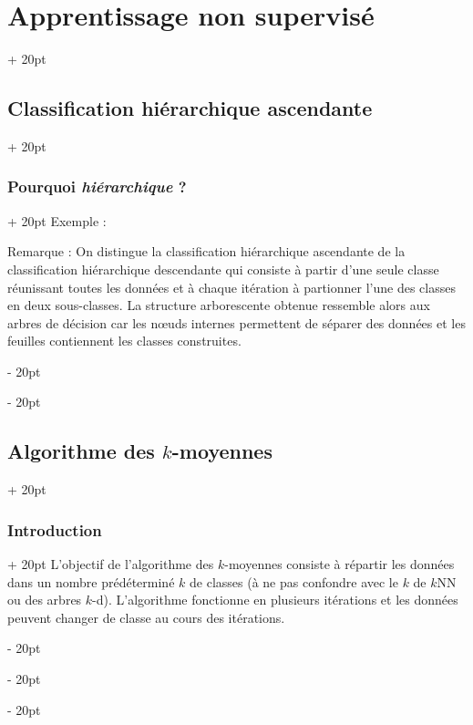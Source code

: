 \documentclass[a4paper, 12pt, twoside]{article}
\newcommand{\ind}[1][20pt]{\advance\leftskip + #1}
\newcommand{\deind}[1][20pt]{\advance\leftskip - #1}
\newenvironment{indt}[2][20pt]{#2 \par \ind[#1]}{\par \deind} %
\begin{document}
\begin{indt}{\section{Apprentissage non supervisé}}
\begin{indt}{\subsection{Classification hiérarchique ascendante}}
\begin{indt}{\subsubsection{Pourquoi \emph{hiérarchique} ?}}
                Exemple :

                \begin{center}
                \end{center}

                Remarque :
                On distingue la classification hiérarchique ascendante de la classification hiérarchique descendante qui consiste à partir d'une seule classe réunissant toutes les données et à chaque itération à partionner l'une des classes en deux sous-classes.
                La structure arborescente obtenue ressemble alors aux arbres de décision car les n\oe uds internes permettent de séparer des données et les feuilles contiennent les classes construites.
            \end{indt}
        \end{indt}

        \vspace{12pt}
        
        \begin{indt}{\subsection{Algorithme des $k$-moyennes}}
            \begin{indt}{\subsubsection{Introduction}}
                L'objectif de l'algorithme des $k$-moyennes consiste à répartir les données dans un nombre prédéterminé $k$ de classes (à ne pas confondre avec le $k$ de $k$NN ou des arbres $k$-d).
                L'algorithme fonctionne en plusieurs itérations et les données peuvent changer de classe au cours des itérations.
            \end{indt}


\end{indt}
\end{indt}
\end{document}
